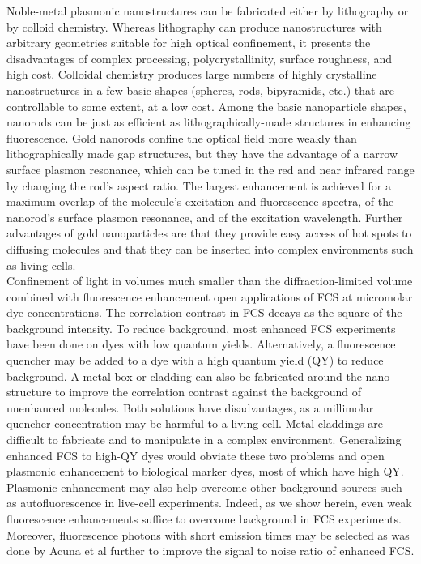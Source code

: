 \documentclass[journal=jpccck,manuscript=article]{achemso}
\begin{document}
Noble-metal plasmonic nanostructures can be fabricated either by lithography or by colloid chemistry.\cite{zijlstra2011single} Whereas lithography can produce nanostructures with arbitrary geometries suitable for high optical confinement, it presents the disadvantages of complex processing, polycrystallinity, surface roughness, and high cost. Colloidal chemistry produces large numbers of highly crystalline nanostructures in a few basic shapes (spheres, rods, bipyramids, etc.) that are controllable to some extent, at a low cost. Among the basic nanoparticle shapes, nanorods\cite{yuan2013thousandfold} can be just as efficient as lithographically-made structures\cite{punj2013a,kinkhabwala2009large} in enhancing fluorescence. Gold nanorods confine the optical field more weakly than lithographically made gap structures, but they have the advantage of a narrow surface plasmon resonance, which can be tuned in the red and near infrared range by changing the rod’s aspect ratio.\cite{khatua2014resonant} The largest enhancement is achieved for a maximum overlap of the molecule’s excitation and fluorescence spectra, of the nanorod’s surface plasmon resonance, and of the excitation wavelength. Further advantages of gold nanoparticles are that they provide easy access of hot spots to diffusing molecules and that they can be inserted into complex environments such as living cells.\\

Confinement of light in volumes much smaller than the diffraction-limited volume combined with fluorescence enhancement open applications of FCS at micromolar dye concentrations. The correlation contrast in FCS decays as the square of the background intensity. To reduce background, most enhanced FCS experiments have been done on dyes with low quantum yields.\cite{kinkhabwala2012fluorescence,estrada200810000} Alternatively, a fluorescence quencher may be added to a dye with a high quantum yield (QY) to reduce background.\cite{punj2013a,punj2013gold} A metal box or cladding\cite{ghenuche2015matching} can also be fabricated around the nano structure to improve the correlation contrast against the background of unenhanced molecules. Both solutions have disadvantages, as a millimolar quencher concentration may be harmful to a living cell. Metal claddings are difficult to fabricate and to manipulate in a complex environment. Generalizing enhanced FCS to high-QY dyes would obviate these two problems and open plasmonic enhancement to biological marker dyes, most of which have high QY. Plasmonic enhancement may also help overcome other background sources such as autofluorescence in live-cell experiments. Indeed, as we show herein, even weak fluorescence enhancements suffice to overcome background in FCS experiments. Moreover, fluorescence photons with short emission times may be selected as was done by Acuna et al\cite{acuna2012fluorescence} further to improve the signal to noise ratio of enhanced FCS.\\
\end{document}
